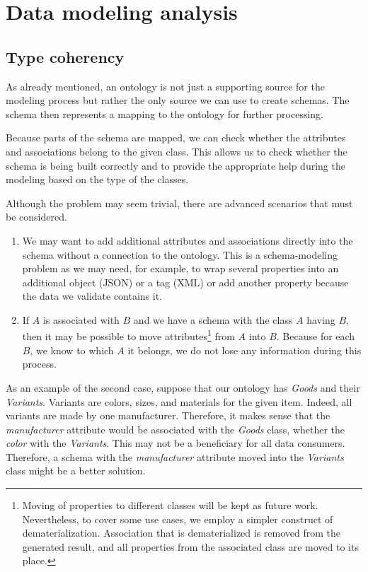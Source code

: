 \section{Data modeling analysis}

\subsection{Type coherency}\label{subsection:type-coherency}

As already mentioned, an ontology is not just a supporting source for the modeling process but rather the only source we can use to create schemas. The schema then represents a mapping to the ontology for further processing.

Because parts of the schema are mapped, we can check whether the attributes and associations belong to the given class. This allows us to check whether the schema is being built correctly and to provide the appropriate help during the modeling based on the type of the classes.

Although the problem may seem trivial, there are advanced scenarios that must be considered.

\begin{enumerate}
  \item We may want to add additional attributes and associations directly into the schema without a connection to the ontology. This is a schema-modeling problem as we may need, for example, to wrap several properties into an additional object (JSON) or a tag (XML) or add another property because the data we validate contains it.
  \item If $A$ is associated with $B$ and we have a schema with the class $A$ having $B$, then it may be possible to move attributes\footnote{Moving of properties to different classes will be kept as future work. Nevertheless, to cover some use cases, we employ a simpler construct of dematerialization. Association that is dematerialized is removed from the generated result, and all properties from the associated class are moved to its place.} from $A$ into $B$. Because for each $B$, we know to which $A$ it belongs, we do not lose any information during this process.
\end{enumerate}

As an example of the second case, suppose that our ontology has \textit{Goods} and their \textit{Variants}. Variants are colors, sizes, and materials for the given item. Indeed, all variants are made by one manufacturer. Therefore, it makes sense that the \textit{manufacturer} attribute would be associated with the \textit{Goods} class, whether the \textit{color} with the \textit{Variants}. This may not be a beneficiary for all data consumers. Therefore, a schema with the \textit{manufacturer} attribute moved into the \textit{Variants} class might be a better solution.


